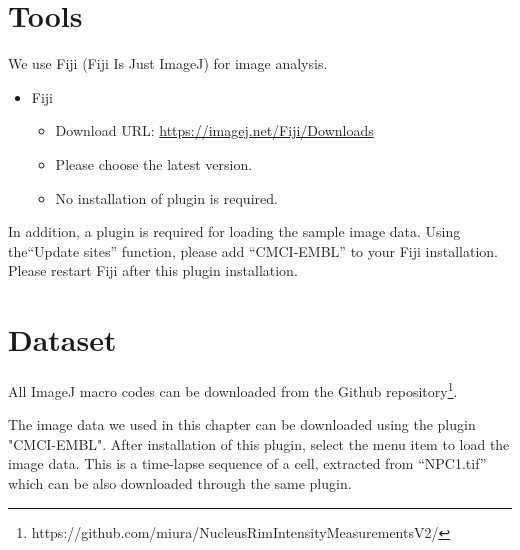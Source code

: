 \section{Tools}


We use Fiji (Fiji Is Just ImageJ) for image analysis.

\begin{itemize}
    \item Fiji
    \begin{itemize}
        \item Download URL: \url{https://imagej.net/Fiji/Downloads}
        \item Please choose the latest version. 
        \item No installation of plugin is required. 
    \end{itemize}
\end{itemize}

In addition, a plugin is required for loading the sample image data. Using the``Update sites'' function, please add ``CMCI-EMBL'' to your Fiji installation. Please restart Fiji after this plugin installation. 

\section{Dataset}



All ImageJ macro codes can be downloaded from the Github repository\footnote{https://github.com/miura/NucleusRimIntensityMeasurementsV2/}. 

The image data we used in this chapter can be downloaded using the plugin "CMCI-EMBL". After installation of this plugin, select the menu item  to load the image data. This is a time-lapse sequence of a cell, extracted from ``NPC1.tif'' which can be also downloaded through the same plugin. 

